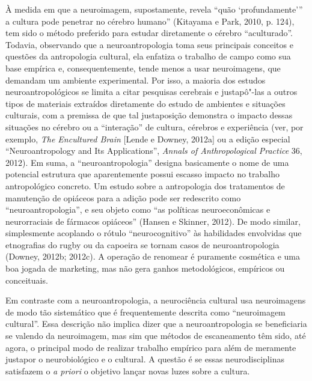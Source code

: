 À medida em que a neuroimagem, supostamente, revela ``quão
`profundamente''' a cultura pode penetrar no cérebro humano'' (Kitayama
e Park, 2010, p. 124), tem sido o método preferido para estudar
diretamente o cérebro ``aculturado''. Todavia, observando que a
neuroantropologia toma seus principais conceitos e questões da
antropologia cultural, ela enfatiza o trabalho de campo como sua base
empírica e, consequentemente, tende menos a usar neuroimagens, que
demandam um ambiente experimental. Por isso, a maioria dos estudos
neuroantropológicos se limita a citar pesquisas cerebrais e justapô"-las
a outros tipos de materiais extraídos diretamente do estudo de ambientes
e situações culturais, com a premissa de que tal justaposição demonstra
o impacto dessas situações no cérebro ou a ``interação'' de cultura,
cérebros e experiência (ver, por exemplo, \emph{The Encultured Brain}
{[}Lende e Downey, 2012a{]} ou a edição especial ``Neuroantropology and
Its Applications'', \emph{Annals of Anthropological Practice} 36, 2012).
Em suma, a ``neuroantropologia'' designa basicamente o nome de uma
potencial estrutura que aparentemente possui escasso impacto no trabalho
antropológico concreto. Um estudo sobre a antropologia dos tratamentos
de manutenção de opiáceos para a adição pode ser redescrito como
``neuroantropologia'', e seu objeto como ``as políticas neuroeconômicas
e neurorraciais de fármacos opiáceos'' (Hansen e Skinner, 2012). De modo
similar, simplesmente acoplando o rótulo ``neurocognitivo'' às
habilidades envolvidas que etnografias do rugby ou da capoeira se tornam
casos de neuroantropologia (Downey, 2012b; 2012c). A operação de
renomear é puramente cosmética e uma boa jogada de marketing, mas não
gera ganhos metodológicos, empíricos ou conceituais.

Em contraste com a neuroantropologia, a neurociência cultural usa
neuroimagens de modo tão sistemático que é frequentemente descrita como
``neuroimagem cultural''. Essa descrição não implica dizer que a
neuroantropologia se beneficiaria se valendo da neuroimagem, mas sim que
métodos de escaneamento têm sido, até agora, o principal modo de
realizar trabalho empírico para além de meramente justapor o
neurobiológico e o cultural. A questão é se essas neurodisciplinas
satisfazem o \emph{a priori} o objetivo lançar novas luzes sobre a
cultura.


